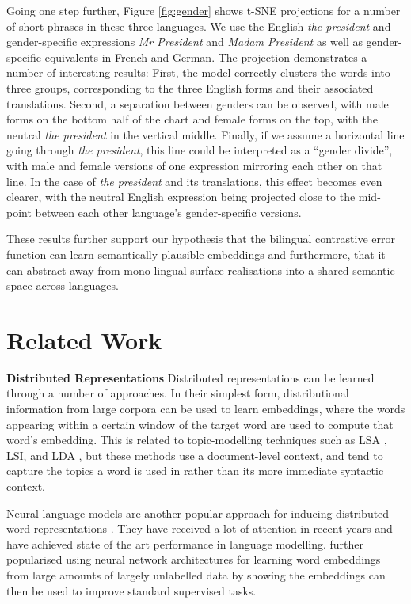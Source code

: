 \documentclass[11pt]{article}
\begin{document}
Going one step further, Figure \ref{fig:gender} shows t-SNE projections for a
number of short phrases in these three languages.  We use the English
\textit{the president} and gender-specific expressions \textit{Mr President} and
\textit{Madam President} as well as gender-specific equivalents in French and
German.  The projection demonstrates a number of interesting results: First, the
model correctly clusters the words into three groups, corresponding to the three
English forms and their associated translations.  Second, a separation between
genders can be observed, with male forms on the bottom half of the chart and
female forms on the top, with the neutral \textit{the president} in the vertical
middle.  Finally, if we assume a horizontal line going through \textit{the
  president}, this line could be interpreted as a ``gender divide'', with male
and female versions of one expression mirroring each other on that line.  In the
case of \textit{the president} and its translations, this effect becomes even
clearer, with the neutral English expression being projected close to the
mid-point between each other language's gender-specific versions.

These results further support our hypothesis that the bilingual contrastive
error function can learn semantically plausible embeddings and furthermore, that
it can abstract away from mono-lingual surface realisations into a shared
semantic space across languages.
 \section{Related Work}

\noindent\textbf{Distributed Representations}\hspace{0.1in}
Distributed representations can be learned through a number of approaches.  In
their simplest form, distributional information from large corpora can be used
to learn embeddings, where the words appearing within a certain window of the
target word are used to compute that word's embedding.  This is related to
topic-modelling techniques such as LSA \cite{Dumais:1988}, LSI, and LDA
\cite{Blei:2003}, but these methods use a document-level context, and tend to
capture the topics a word is used in rather than its more immediate syntactic
context.

Neural language models are another popular approach for inducing distributed
word representations \cite{Bengio:2003}.  They have received a lot of attention
in recent years \cite[\textit{inter
    alia}]{Collobert:2008,Mnih:2009,Mikolov:2010} and have achieved state of the
art performance in language modelling.
 further popularised using neural network architectures
for learning word embeddings from large amounts of largely unlabelled data by
showing the embeddings can then be used to improve standard supervised tasks.
\end{document}
